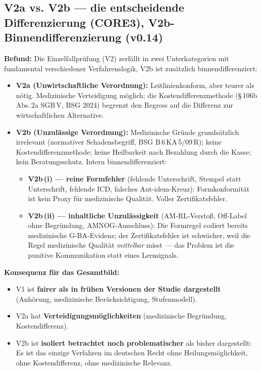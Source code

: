 \documentclass{umbruch-position}
\begin{document}
\subsection{V2a vs. V2b --- die entscheidende Differenzierung (CORE3), V2b-Binnendifferenzierung (v0.14)}

\textbf{Befund:} Die Einzelfallpr\"ufung (V2) zerf\"allt in zwei Unterkategorien mit fundamental verschiedener Verfahrenslogik, V2b ist zus\"atzlich binnendifferenziert:

\begin{itemize}
  \item \textbf{V2a (Unwirtschaftliche Verordnung):} Leitlinienkonform, aber teurer als n\"otig. Medizinische Verteidigung m\"oglich; die Kostendifferenzmethode (\S\,106b Abs.\,2a SGB\,V, BSG 2024) begrenzt den Regress auf die Differenz zur wirtschaftlichen Alternative.
  \item \textbf{V2b (Unzul\"assige Verordnung):} Medizinische Gr\"unde grunds\"atzlich irrelevant (normativer Schadensbegriff, BSG B\,6\,KA\,5/09\,R); keine Kostendifferenzmethode; keine Heilbarkeit nach Bezahlung durch die Kasse; kein Beratungsschutz. Intern binnendifferenziert:
  \begin{itemize}
    \item \textbf{V2b\,(i) --- reine Formfehler} (fehlende Unterschrift, Stempel statt Unterschrift, fehlende ICD, falsches Aut-idem-Kreuz): Formkonformit\"at ist kein Proxy f\"ur medizinische Qualit\"at. Voller Zertifikatsfehler.
    \item \textbf{V2b\,(ii) --- inhaltliche Unzul\"assigkeit} (AM-RL-Versto\ss{}, Off-Label ohne Begr\"undung, AMNOG-Ausschluss): Die Formregel codiert bereits medizinische G-BA-Evidenz; der Zertifikatsfehler ist schw\"acher, weil die Regel medizinische Qualit\"at \emph{mittelbar} misst --- das Problem ist die punitive Kommunikation statt eines Lernsignals.
  \end{itemize}
\end{itemize}

\textbf{Konsequenz f\"ur das Gesamtbild:}
\begin{itemize}
  \item V1 ist \textbf{fairer als in fr\"uhen Versionen der Studie dargestellt} (Anh\"orung, medizinische Ber\"ucksichtigung, Stufenmodell).
  \item V2a hat \textbf{Verteidigungsm\"oglichkeiten} (medizinische Begr\"undung, Kostendifferenz).
  \item V2b ist \textbf{isoliert betrachtet noch problematischer} als bisher dargestellt: Es ist das einzige Verfahren im deutschen Recht ohne Heilungsm\"oglichkeit, ohne Kostendifferenz, ohne medizinische Relevanz.
\end{itemize}
\end{document}
